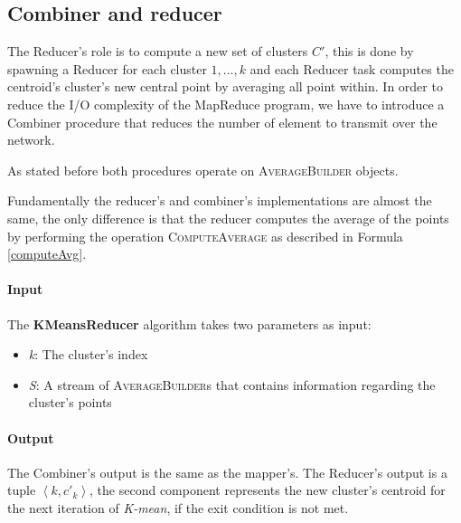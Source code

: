 \documentclass[parskip=full]{report}
\begin{document}
\subsection{Combiner and reducer}
The Reducer's role is to compute a new set of clusters $C'$, this is done by spawning a Reducer for each cluster $1, \dots, k$ and each Reducer task computes the centroid's cluster's new central point by averaging all point 
within. In order to reduce the I/O complexity of the MapReduce program, we have 
to introduce a Combiner procedure that reduces the number of element to 
transmit over the network.

As stated before both procedures operate on \textsc{AverageBuilder} objects.

Fundamentally the reducer's and combiner's implementations are almost the same, 
the only difference is that the reducer computes the average of the points by 
performing the operation \textsc{ComputeAverage} as described in Formula 
\ref{computeAvg}.

\paragraph{Input}

The \textbf{KMeansReducer} algorithm takes two parameters as input:
\begin{itemize}
	\item \textit{k}: The cluster's index
	\item \textit{S}: A stream of \textsc{AverageBuilder}s that contains 
	information regarding the cluster's points
\end{itemize}

\paragraph{Output}

The Combiner's output is the same as the mapper's. The Reducer's output is a 
tuple $\left\langle k, {c'}_k \right\rangle$, the second component represents 
the new cluster's centroid for the next iteration of \emph{K-mean}, if the exit 
condition is not met.

%
\end{document}
